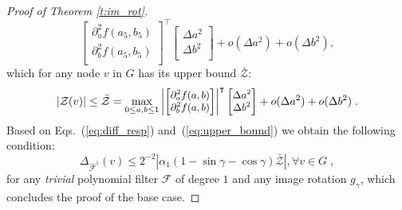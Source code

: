 \documentclass[10pt,journal,compsoc]{IEEEtran}
\newcommand{\hmF}{\hat{\mathcal{F}}}
\newcommand{\norm}[1]{\left|#1\right|}
\begin{document}
\begin{proof}[Proof of Theorem \ref{t:im_rot}]
\begin{equation}
\begin{bmatrix}
		\partial_a^2 f (a_5, b_5)\\
		\partial_b^2 f (a_5,b_5)\\
		\end{bmatrix}^{\intercal}
		\begin{bmatrix}
		\Delta a^2 \\
		\Delta b^2 \\
		\end{bmatrix} + o(\Delta a^2) + o(\Delta b^2),
		\label{eq:sec_der_base}
		\end{equation}
		\noindent
		which for any node $v$ in $G$ has its upper bound $\bar{\mathcal{Z}}$:
		\begin{equation}
		\small
		\norm{\mathcal{Z}(v)} \leq \bar{\mathcal{Z}} = 
		\max_{0 \leq a,b \leq 1} \left|
		\begin{bmatrix}
		\partial_a^2 f (a,b)\\
		\partial_b^2 f (a,b)\\
		\end{bmatrix}
		\right|^{\intercal}
		\begin{bmatrix}
		\Delta a^2 \\
		\Delta b^2 \\
		\end{bmatrix} + o(\Delta a^2) + o(\Delta b^2) \;.
		\label{eq:upper_bound}
		\end{equation}
		\noindent
		Based on Eqs.~(\ref{eq:diff_resp}) and~(\ref{eq:upper_bound}) we obtain the following condition:
		\begin{equation}
		\Delta_{\hmF^1}(v) \leq 2^{-2}\norm{\alpha_1(1 - \sin\gamma - \cos\gamma) \bar{\mathcal{Z}}}, \forall v \in G \;,
		\label{eq:filt_rot_single_fin}
		\end{equation}
		\noindent
		for any \emph{trivial} polynomial filter $\mathcal{F}$ of degree $1$ and any image rotation $g_\gamma$, which concludes the proof of the base case.
		

\end{proof}
\end{document}
